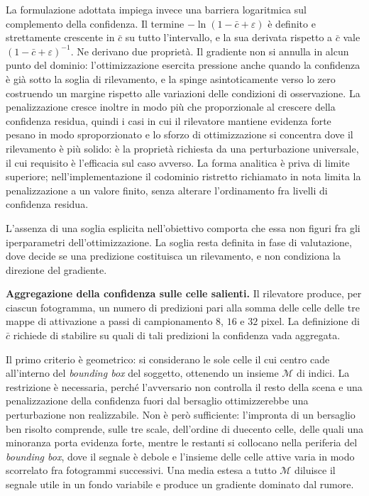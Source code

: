 \documentclass[a4paper,12pt]{report}
\begin{document}
La formulazione adottata impiega invece una barriera logaritmica sul complemento
della confidenza. Il termine $-\ln(1 - \bar{c} + \varepsilon)$ è definito e
strettamente crescente in $\bar{c}$ su tutto l'intervallo, e la sua derivata
rispetto a $\bar{c}$ vale $(1 - \bar{c} + \varepsilon)^{-1}$. Ne derivano due
proprietà. Il gradiente non si annulla in alcun punto del dominio:
l'ottimizzazione esercita pressione anche quando la confidenza è già sotto la
soglia di rilevamento, e la spinge asintoticamente verso lo zero costruendo un
margine rispetto alle variazioni delle condizioni di osservazione. La
penalizzazione cresce inoltre in modo più che proporzionale al crescere della
confidenza residua, quindi i casi in cui il rilevatore mantiene evidenza forte
pesano in modo sproporzionato e lo sforzo di ottimizzazione si concentra dove il
rilevamento è più solido: è la proprietà richiesta da una perturbazione
universale, il cui requisito è l'efficacia sul caso avverso. La forma analitica
è priva di limite superiore; nell'implementazione il codominio ristretto
richiamato in nota limita la penalizzazione a un valore finito, senza alterare
l'ordinamento fra livelli di confidenza residua.

L'assenza di una soglia esplicita nell'obiettivo comporta che essa non figuri
fra gli iperparametri dell'ottimizzazione. La soglia resta definita in fase di
valutazione, dove decide se una predizione costituisca un rilevamento, e non
condiziona la direzione del gradiente.

\textbf{Aggregazione della confidenza sulle celle salienti.}
\label{sec:topk}
Il rilevatore produce, per ciascun fotogramma, un numero di predizioni pari alla
somma delle celle delle tre mappe di attivazione a passi di campionamento $8$,
$16$ e $32$ pixel. La definizione di $\bar{c}$ richiede di stabilire su quali di
tali predizioni la confidenza vada aggregata.

Il primo criterio è geometrico: si considerano le sole celle il cui centro cade
all'interno del \textit{bounding box} del soggetto, ottenendo un insieme
$\mathcal{M}$ di indici. La restrizione è necessaria, perché l'avversario non
controlla il resto della scena e una penalizzazione della confidenza fuori dal
bersaglio ottimizzerebbe una perturbazione non realizzabile. Non è però
sufficiente: l'impronta di un bersaglio ben risolto comprende, sulle tre scale,
dell'ordine di duecento celle, delle quali una minoranza porta evidenza forte,
mentre le restanti si collocano nella periferia del \textit{bounding box}, dove
il segnale è debole e l'insieme delle celle attive varia in modo scorrelato fra
fotogrammi successivi. Una media estesa a tutto $\mathcal{M}$ diluisce il
segnale utile in un fondo variabile e produce un gradiente dominato dal rumore.
\end{document}
